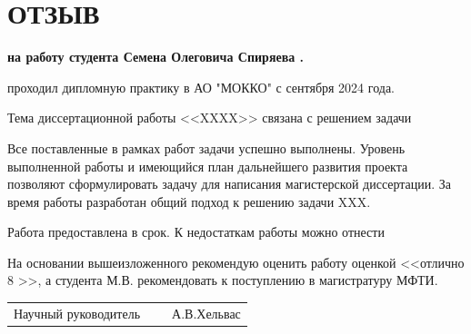 \pagestyle{empty} %
\chapter*{ОТЗЫВ}
\textbf{на работу студента   Семена Олеговича Спиряева .}

 проходил дипломную практику в АО "МОККО" с сентября 2024 года.

Тема диссертационной работы <<XXXX>> связана с решением задачи    

 
Все поставленные в рамках работ задачи  успешно выполнены. Уровень выполненной работы и имеющийся план дальнейшего развития  проекта позволяют сформулировать задачу для написания магистерской диссертации.   За время работы   разработан общий подход к решению задачи   XXX. 
  

Работа предоставлена в срок.
К недостаткам работы можно отнести   

На основании вышеизложенного рекомендую оценить работу оценкой <<отлично 8 >>, а   студента  М.В. рекомендовать к поступлению в магистратуру МФТИ.
	
 \begin{tabular}{p{200pt}p{100pt}p{100pt}} \\[10pt]
        Научный руководитель  & &~А.В.Хельвас \\  
    \end{tabular}    